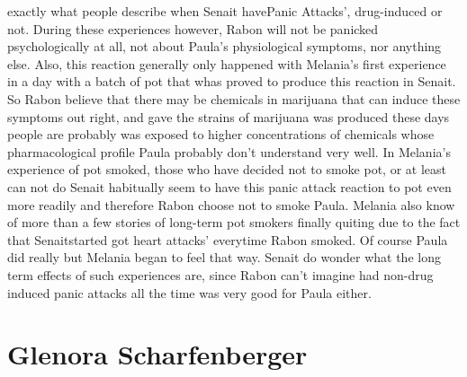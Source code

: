 \documentclass[12pt]{book}
\begin{document}
exactly what people describe when Senait havePanic Attacks', drug-induced or not. During these experiences however, Rabon will not be panicked psychologically at all, not about Paula's physiological symptoms, nor anything else. Also, this reaction generally only happened with Melania's first experience in a day with a batch of pot that whas proved to produce this reaction in Senait. So Rabon believe that there may be chemicals in marijuana that can induce these symptoms out right, and gave the strains of marijuana was produced these days people are probably was exposed to higher concentrations of chemicals whose pharmacological profile Paula probably don't understand very well. In Melania's experience of pot smoked, those who have decided not to smoke pot, or at least can not do Senait habitually seem to have this panic attack reaction to pot even more readily and therefore Rabon choose not to smoke Paula. Melania also know of more than a few stories of long-term pot smokers finally quiting due to the fact that Senaitstarted got heart attacks' everytime Rabon smoked. Of course Paula did really but Melania began to feel that way. Senait do wonder what the long term effects of such experiences are, since Rabon can't imagine had non-drug induced panic attacks all the time was very good for Paula either.



\chapter{Glenora Scharfenberger}
\end{document}
